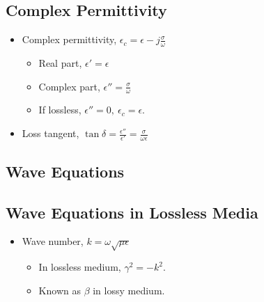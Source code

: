 \documentclass[a4paper]{article}
\begin{document}
\subsection{Complex Permittivity}
\begin{itemize}
    \item Complex permittivity, $\epsilon_c = \epsilon-j\displaystyle\frac{\sigma}{\omega}$
    \begin{itemize}[label=$\circ$]
        \item Real part, $\epsilon' = \epsilon$
        \item Complex part, $\epsilon'' = \displaystyle\frac{\sigma}{\omega}$
        \item If lossless, $\epsilon'' = 0,\ \epsilon_c = \epsilon$.
    \end{itemize}
    \item Loss tangent, $\tan\delta = \displaystyle\frac{\epsilon''}{\epsilon'} = \displaystyle\frac{\sigma}{\omega\epsilon}$
\end{itemize}

\subsection{Wave Equations}
\begin{center}
\end{center}

\subsection{Wave Equations in Lossless Media}
\begin{itemize}
    \item Wave number, $k= \omega\sqrt{\mu\epsilon}$
    \begin{itemize}[label=$\circ$]
        \item In lossless medium, $\gamma^2 = -k^2$.
        \begin{center}
        \end{center}
        \item Known as $\beta$ in lossy medium.
    \end{itemize}
\end{itemize}
\end{document}
